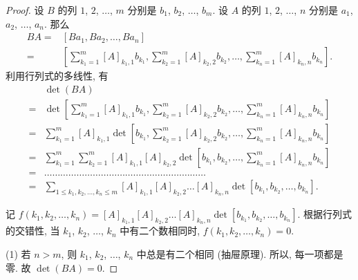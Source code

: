 \begin{proof}
    设 \(B\) 的列
    \(1\), \(2\), \(\dots\), \(m\)
    分别是
    \(b_1\), \(b_2\), \(\dots\), \(b_m\).
    设 \(A\) 的列
    \(1\), \(2\), \(\dots\), \(n\)
    分别是
    \(a_1\), \(a_2\), \(\dots\), \(a_n\).
    那么
    \begin{align*}
        BA
        = {} & [Ba_1, Ba_2, \dots, Ba_n] \\
        = {} &
        \left[
        \sum_{k_1 = 1}^{m} {[A]_{k_1,1} b_{k_1}},
        \sum_{k_2 = 1}^{m} {[A]_{k_2,2} b_{k_2}},
        \dots,
        \sum_{k_n = 1}^{m} {[A]_{k_n,n} b_{k_n}}
        \right].
    \end{align*}
    利用行列式的多线性, 有
    \begin{align*}
             & \det {(BA)}
        \\
        = {} &
        \det {\left[
        \sum_{k_1 = 1}^{m} {[A]_{k_1,1} b_{k_1}},
        \sum_{k_2 = 1}^{m} {[A]_{k_2,2} b_{k_2}},
        \dots,
        \sum_{k_n = 1}^{m} {[A]_{k_n,n} b_{k_n}}
        \right]}
        \\
        = {} &
        \sum_{k_1 = 1}^{m} {[A]_{k_1,1}
        \det {\left[
        b_{k_1},
        \sum_{k_2 = 1}^{m} {[A]_{k_2,2} b_{k_2}},
        \dots,
        \sum_{k_n = 1}^{m} {[A]_{k_n,n} b_{k_n}}
        \right]}}
        \\
        = {} &
        \sum_{k_1 = 1}^{m} {
        \sum_{k_2 = 1}^{m} {
        [A]_{k_1,1} [A]_{k_2,2}
        \det {\left[
        b_{k_1},
        b_{k_2},
        \dots,
        \sum_{k_n = 1}^{m} {[A]_{k_n,n} b_{k_n}}
        \right]}}}
        \\
        = {} &
        \dots \dots \dots \dots
        \dots \dots \dots \dots
        \dots \dots \dots \dots
        \dots \dots \dots \dots
        \dots \dots \dots \dots
        \\
        = {} &
        \sum_{1 \leq k_1, k_2, \dots, k_n \leq m}
        {[A]_{k_1,1} [A]_{k_2,2} \dots [A]_{k_n,n}
            \det {[b_{k_1}, b_{k_2}, \dots, b_{k_n}]}}.
    \end{align*}

    记
    \(
    f(k_1, k_2, \dots, k_n)
    = [A]_{k_1,1} [A]_{k_2,2} \dots [A]_{k_n,n}
    \det {[b_{k_1}, b_{k_2}, \dots, b_{k_n}]}.
    \)
    根据行列式的交错性,
    当 \(k_1\), \(k_2\), \(\dots\), \(k_n\) 中有二个数相同时,
    \(f(k_1, k_2, \dots, k_n) = 0\).

    (1)
    若 \(n > m\), 则 \(k_1\), \(k_2\), \(\dots\), \(k_n\)
    中总是有二个相同
    (抽屉原理).
    所以, 每一项都是零.
    故 \(\det {(BA)} = 0\).


\end{proof}
